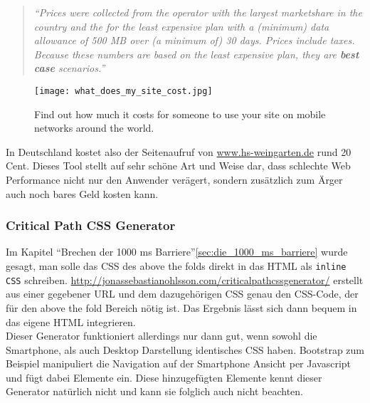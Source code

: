 			\begin{quote}
				\textit{"`Prices were collected from the operator with the largest marketshare in the country and the for the least expensive plan with a (minimum) data allowance of 500 MB over (a minimum of) 30 days. Prices include taxes. Because these numbers are based on the least expensive plan, they are \textbf{best case} scenarios."'}\autocite{siteCosts}
			\end{quote}

		\begin{figure}[htbp]
			\begin{center}
				\texttt{[image: what\_does\_my\_site\_cost.jpg]}
				\caption{Find out how much it costs for someone to use your site on mobile networks around the world.\autocite{siteCosts}}
				\label{fig:what_does_my_site_cost}
			\end{center}
		\end{figure}

		In Deutschland kostet also der Seitenaufruf von \url{www.hs-weingarten.de} rund 20 Cent. Dieses Tool stellt auf sehr schöne Art und Weise dar, dass schlechte Web Performance nicht nur den Anwender verägert, sondern zusätzlich zum Ärger auch noch bares Geld kosten kann.

		\subsubsection{Critical Path CSS Generator} %
		\label{ssub:critical_path_css_generator}
			Im Kapitel "`Brechen der 1000 ms Barriere"'\ref{sec:die_1000_ms_barriere} wurde gesagt, man solle das CSS des above the folds direkt in das HTML als \texttt{inline CSS} schreiben. \url{http://jonassebastianohlsson.com/criticalpathcssgenerator/} erstellt aus einer gegebener URL und dem dazugehörigen CSS genau den CSS-Code, der für den above the fold Bereich nötig ist. Das Ergebnis lässt sich dann bequem in das eigene HTML integrieren.\\

			Dieser Generator funktioniert allerdings nur dann gut, wenn sowohl die Smartphone, als auch Desktop Darstellung identisches CSS haben. Bootstrap zum Beispiel manipuliert die Navigation auf der Smartphone Ansicht per Javascript und fügt dabei Elemente ein. Diese hinzugefügten Elemente kennt dieser Generator natürlich nicht und kann sie folglich auch nicht beachten.


